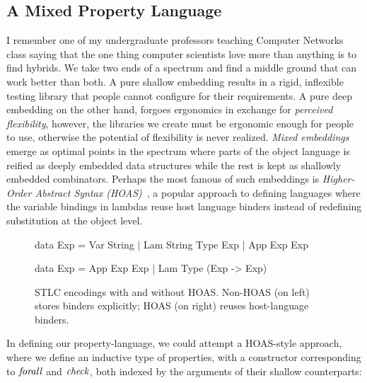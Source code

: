 \subsection{A Mixed Property Language}\label{sec:dbas}

I remember one of my undergraduate professors teaching Computer Networks class saying
that the one thing computer scientists love more than anything is to find hybrids. We
take two ends of a spectrum and find a middle ground that can work better than both. A
pure shallow embedding results in a rigid, inflexible testing library that people
cannot configure for their requirements. A pure deep embedding on the other hand,
forgoes ergonomics in exchange for \emph{perceived flexibility}, however, the libraries
we create must be ergonomic enough for people to use, otherwise the potential of
flexibility is never realized. \emph{Mixed embeddings} emerge as optimal points in the
spectrum where parts of the object language is reified as deeply embedded data
structures while the rest is kept as shallowly embedded combinators. Perhaps the most
famous of such embeddings is \emph{Higher-Order Abstract Syntax
  (HOAS)}~\cite{PfenningElliott1988HOAS}, a popular approach to defining languages where
the variable bindings in lambdas reuse host language binders instead of redefining
substitution at the object level.

\begin{figure}[h]
  \centering
  \begin{minipage}[t]{0.48\linewidth}
    \begin{code}[language=Haskell]
data Exp
  = Var String
  | Lam String Type Exp
  | App Exp Exp
    \end{code}
  \end{minipage}
  \hfill
  \begin{minipage}[t]{0.48\linewidth}
    \begin{code}[language=Haskell]
data Exp
  = App Exp Exp
  | Lam Type (Exp -> Exp)
    \end{code}
  \end{minipage}
  \caption[STLC encodings with and without HOAS.]{STLC encodings with and without HOAS. Non-HOAS (on left) stores binders explicitly; HOAS (on right) reuses host-language binders.}
  \label{fig:stlc-hoas-vs-non-hoas}
\end{figure}

In defining our property-language, we could attempt a HOAS-style approach, where we
define an inductive type of properties, with a constructor corresponding to $\mathit{forall}$
and $\mathit{check}$, both indexed by the arguments of their shallow counterparts:

